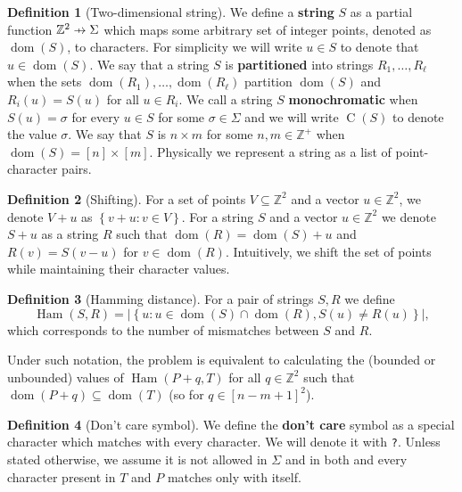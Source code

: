 \documentclass[11pt]{article}
\newcommand{\Z}{\mathbb{Z}}
\newcommand{\set}[1]{\left\lbrace #1 \right\rbrace}
\theoremstyle{plain}
\theoremstyle{definition}
\newtheorem{definition}{Definition}
\theoremstyle{remark}
\DeclareMathOperator*{\Ham}{Ham}
\DeclareMathOperator*{\dom}{dom}
\DeclareMathOperator*{\charrr}{C}
\begin{document}
\newcommand{\getchar}[1]{\charrr(#1)}
\newcommand{\pto}{\mathrel{\ooalign{\hfil$\mapstochar\mkern5mu$\hfil\cr$\to$\cr}}}
\renewcommand{\d}[1]{\dom(#1)}
\newcommand{\f}[1]{#1^\mathbf{f}}
\begin{definition}[Two-dimensional string]
	We define a \textbf{string} $S$ as a partial function $\Z^2 \pto \Sigma$ which maps some arbitrary set of integer points, denoted as $\d{S}$, to characters.
	For simplicity we will write $u \in S$ to denote that $u \in \d{S}$.
	We say that a string $S$ is \textbf{partitioned} into strings $R_1, \dots, R_\ell$ when the sets $\d{R_1}, \dots, \d{R_\ell}$ partition $\d{S}$ and $R_i(u) = S(u)$ for all $u \in R_i$.
	We call a string $S$ \textbf{monochromatic} when $S(u) = \sigma$ for every $u \in S$ for some $\sigma \in \Sigma$ and we will write $\getchar{S}$ to denote the value $\sigma$.
	We say that $S$ is $n \times m$ for some $n, m \in \Z^+$ when $\d{S} = [n] \times [m]$.
	Physically we represent a string as a list of point-character pairs.
\end{definition}


\begin{definition}[Shifting]
	For a set of points $V \subseteq \Z^2$ and a vector $u \in \Z^2$, we denote $V + u$ as $\set{v + u : v \in V}$.
	For a string $S$ and a vector $u \in \Z^2$ we denote $S + u$ as a string $R$ such that
	$\d{R} = \d{S} + u$ and $R(v) = S(v - u)$ for $v \in \d{R}$.
	Intuitively, we shift the set of points while maintaining their character values.
\end{definition}


\begin{definition}[Hamming distance]
	For a pair of strings $S, R$ we define
	$$ \Ham(S, R) = |\set{u : u \in \d{S} \cap \d{R}, S(u) \neq R(u)}|,$$
	which corresponds to the number of mismatches between $S$ and $R$.
\end{definition}


Under such notation, the \HD problem is equivalent to calculating the (bounded or unbounded) values of $ \Ham(P + q, T) $
for all $q \in \Z^2$ such that $\d{P + q} \subseteq \d{T}$ (so for $q \in [n - m + 1]^2$).


\begin{definition}[Don't care symbol]
	We define the \textbf{don't care} symbol as a special character which matches with every character.
	We will denote it with \texttt{?}.
	Unless stated otherwise, we assume it is not allowed in $\Sigma$ and in both \hd and \HD every character present in $T$ and $P$ matches only with itself.
\end{definition}
\end{document}
